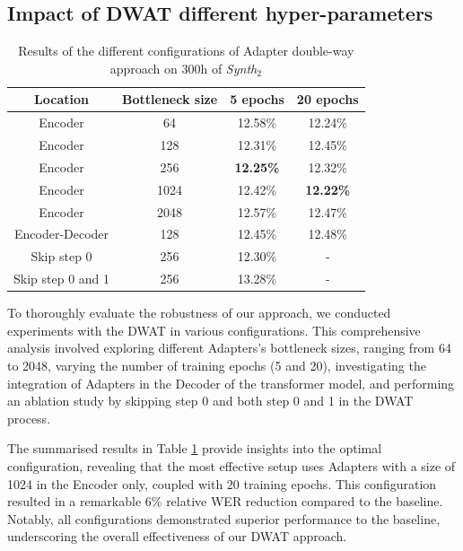 \subsection{Impact of DWAT different hyper-parameters}
\label{sec:hyperparameter}
\begin{table}[t]
\centering
\begin{tabular}{cccc}
\hline
 Location &  Bottleneck size &  5 epochs &  20 epochs     \\ \hline
\multicolumn{1}{c}{Encoder} & 64 & 12.58\% & 12.24\% \\ 
\multicolumn{1}{c}{Encoder} & 128 &  12.31\% & 12.45\%  \\ 
\multicolumn{1}{c}{Encoder} & 256  & \textbf{12.25\%} & 12.32\%  \\ 
\multicolumn{1}{c}{Encoder} & 1024 & 12.42\% & \textbf{12.22\%} \\ 
\multicolumn{1}{c}{Encoder} & 2048 & 12.57\% & 12.47\% \\ \hline
\multicolumn{1}{c}{Encoder-Decoder} & 128 & 12.45\% & 12.48\% \\ \hline
\multicolumn{1}{c}{Skip step 0} & 256 & 12.30\% & - \\ 
\multicolumn{1}{c}{Skip step 0 and 1} & 256 & 13.28\% & - \\ \hline

\end{tabular}

\caption{Results of the different configurations of Adapter double-way approach on 300h of \textit{Synth$_2$}}
\label{tab:config}
\end{table}
To thoroughly evaluate the robustness of our approach, we conducted experiments with the \ac{DWAT} in various configurations. This comprehensive analysis involved exploring different Adapters's bottleneck sizes, ranging from 64 to 2048, varying the number of training epochs (5 and 20), investigating the integration of Adapters in the Decoder of the transformer model, and performing an ablation study by skipping step 0 and both step 0 and 1 in the \ac{DWAT} process.

The summarised results in Table \ref{tab:config} provide insights into the optimal configuration, revealing that the most effective setup uses Adapters with a size of 1024 in the Encoder only, coupled with 20 training epochs. This configuration resulted in a remarkable 6\% relative \ac{WER} reduction compared to the baseline. Notably, all configurations demonstrated superior performance to the baseline, underscoring the overall effectiveness of our \ac{DWAT} approach.

